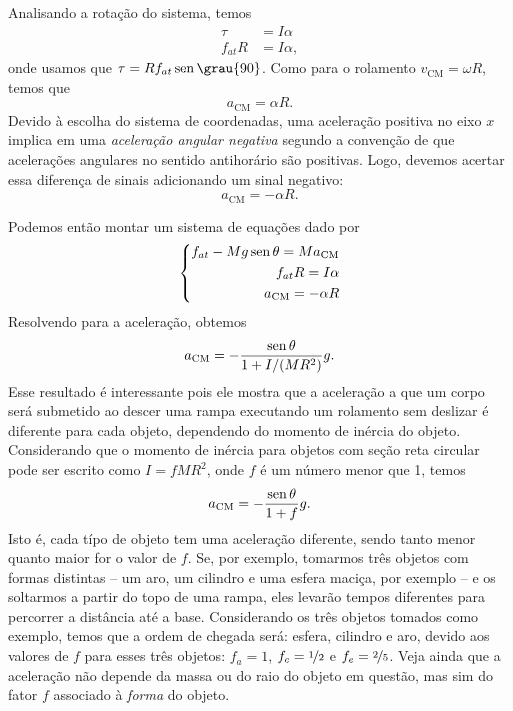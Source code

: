 Analisando a rotação do sistema, temos
\begin{align}
  \tau &= I\alpha \\
  f_{at} R &=I\alpha,
\end{align}
%
onde usamos que $\tau = R f_{at} \sen\grau{90}$. Como para o rolamento $v_{\textrm{CM}} = \omega R$, temos que 
\begin{equation}
  a_{\textrm{CM}} = \alpha R.
\end{equation}
%
Devido à escolha do sistema de coordenadas, uma aceleração positiva no eixo $x$ implica em uma \emph{aceleração angular negativa} segundo a convenção de que acelerações angulares no sentido antihorário são positivas. Logo, devemos acertar essa diferença de sinais adicionando um sinal negativo:
\begin{equation}
  a_{\textrm{CM}} = -\alpha R.
\end{equation}

Podemos então montar um sistema de equações dado por
\begin{equation}
\left\{ \begin{aligned} f_{at} - Mg\operatorname{sen}\theta = M a_{\textrm{CM}} \\ f_{at}R = I\alpha \\ a_{\textrm{CM}} = -\alpha R \end{aligned}\right.
\end{equation}
%
Resolvendo para a aceleração, obtemos
\begin{equation}
  a_{\textrm{CM}} = -\frac{\operatorname{sen}\theta}{1+I/(MR^2)} g.
\end{equation}
%
Esse resultado é interessante pois ele mostra que a aceleração a que um corpo será submetido ao descer uma rampa executando um rolamento sem deslizar é diferente para cada objeto, dependendo do momento de inércia do objeto. Considerando que o momento de inércia para objetos com seção reta circular pode ser escrito como $I = f MR^2$, onde $f$ é um número menor que 1, temos
\begin{equation}
  a_{\textrm{CM}} = -\frac{\operatorname{sen}\theta}{1+f} g.
\end{equation}
%
Isto é, cada típo de objeto tem uma aceleração diferente, sendo tanto menor quanto maior for o valor de $f$. Se, por exemplo, tomarmos três objetos com formas distintas -- um aro, um cilindro e uma esfera maciça, por exemplo -- e os soltarmos a partir do topo de uma rampa, eles levarão tempos diferentes para percorrer a distância até a base. Considerando os três objetos tomados como exemplo, temos que a ordem de chegada será: esfera, cilindro e aro, devido aos valores de $f$ para esses três objetos: $f_a = 1$, $f_c = \nicefrac{1}{2}$ e $f_e = \nicefrac{2}{5}$. Veja ainda que a aceleração não depende da massa ou do raio do objeto em questão, mas sim do fator $f$ associado à \emph{forma} do objeto.

